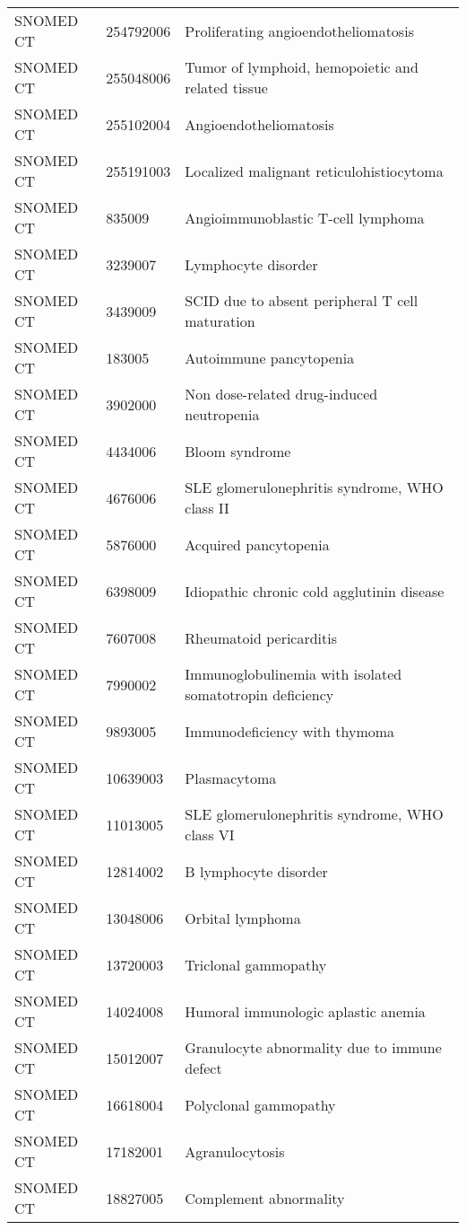 \begin{longtable}{p{}p{}p{}}
  SNOMED CT & 254792006 & Proliferating angioendotheliomatosis \\ 
  SNOMED CT & 255048006 & Tumor of lymphoid, hemopoietic and related tissue \\ 
  SNOMED CT & 255102004 & Angioendotheliomatosis \\ 
  SNOMED CT & 255191003 & Localized malignant reticulohistiocytoma \\ 
  SNOMED CT & 835009 & Angioimmunoblastic T-cell lymphoma \\ 
  SNOMED CT & 3239007 & Lymphocyte disorder \\ 
  SNOMED CT & 3439009 & SCID due to absent peripheral T cell maturation \\ 
  SNOMED CT & 183005 & Autoimmune pancytopenia \\ 
  SNOMED CT & 3902000 & Non dose-related drug-induced neutropenia \\ 
  SNOMED CT & 4434006 & Bloom syndrome \\ 
  SNOMED CT & 4676006 & SLE glomerulonephritis syndrome, WHO class II \\ 
  SNOMED CT & 5876000 & Acquired pancytopenia \\ 
  SNOMED CT & 6398009 & Idiopathic chronic cold agglutinin disease \\ 
  SNOMED CT & 7607008 & Rheumatoid pericarditis \\ 
  SNOMED CT & 7990002 & Immunoglobulinemia with isolated somatotropin deficiency \\ 
  SNOMED CT & 9893005 & Immunodeficiency with thymoma \\ 
  SNOMED CT & 10639003 & Plasmacytoma \\ 
  SNOMED CT & 11013005 & SLE glomerulonephritis syndrome, WHO class VI \\ 
  SNOMED CT & 12814002 & B lymphocyte disorder \\ 
  SNOMED CT & 13048006 & Orbital lymphoma \\ 
  SNOMED CT & 13720003 & Triclonal gammopathy \\ 
  SNOMED CT & 14024008 & Humoral immunologic aplastic anemia \\ 
  SNOMED CT & 15012007 & Granulocyte abnormality due to immune defect \\ 
  SNOMED CT & 16618004 & Polyclonal gammopathy \\ 
  SNOMED CT & 17182001 & Agranulocytosis \\ 
  SNOMED CT & 18827005 & Complement abnormality \\ 

\end{longtable}
